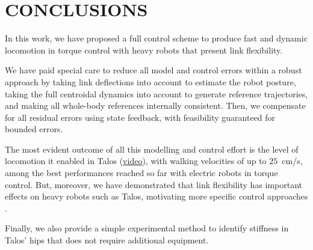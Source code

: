\documentclass[letterpaper, 10 pt, conference]{ieeeconf}  %
\begin{document}

\section{CONCLUSIONS}\label{Sec.Conclu}

In this work, we have proposed a full control scheme to produce fast and dynamic locomotion in torque control with heavy robots that present link flexibility.

We have paid special care to reduce all model and control errors within a robust approach by taking link deflections into account to estimate the robot posture, taking the full centroidal dynamics into account to generate reference trajectories, and making all whole-body references internally consistent. Then, we compensate for all residual errors using state feedback, with feasibility guaranteed for bounded errors.

The most evident outcome of all this modelling and control effort is the level of locomotion it enabled in Talos (\href{ https://gepettoweb.laas.fr/articles/talos_centroidal_mpc_torque_control.html}{video}), with walking velocities of up to $25$~cm/s, among the best performances reached so far with electric robots in torque control. But, moreover, we have demonstrated that link flexibility has important effects on heavy robots such as Talos, motivating more specific control approaches \cite{Giulio2022_TalosFlex}.

Finally, we also provide a simple experimental method to identify stiffness in Talos' hips that does not require additional equipment.



\end{document}
